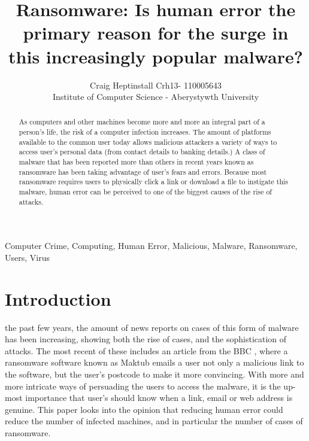 \documentclass[journal,comsoc]{IEEEtran}
\begin{document}
\title{Ransomware: Is human error the primary reason for the surge in this increasingly popular malware?}
\author{Craig Heptinstall Crh13- 110005643\\Institute of Computer Science - Aberystywth University}
\maketitle

\begin{abstract}
As computers and other machines become more and more an integral part of a person's life, the risk of a computer infection increases. The amount of platforms available to the common user today allows malicious attackers a variety of ways to access user's personal data (from contact details to banking details.) A class of malware that has been reported more than others in recent years known as ransomware has been taking advantage of user's fears and errors. Because most ransomware requires users to physically click a link or download a file to instigate this malware, human error can be perceived to one of the biggest causes of the rise of attacks. 
\end{abstract}

\begin{IEEEkeywords}
Computer Crime, Computing, Human Error, Malicious, Malware, Ransomware, Users, Virus
\end{IEEEkeywords}

\IEEEpeerreviewmaketitle

\section{Introduction}
 the past few years, the amount of news reports on cases of this form of malware has been increasing, showing both the rise of cases, and the sophistication of attacks. The most recent of these includes an article from the BBC \cite{bbc-ransomware}, where a ransomware software known as Maktub emails a user not only a malicious link to the software, but the user's postcode to make it more convincing. With more and more intricate ways of persuading the users to access the malware, it is the up-most importance that user's should know when a link, email or web address is genuine. This paper looks into the opinion that reducing human error could reduce the number of infected machines, and in particular the number of cases of ransomware.
\end{document}
